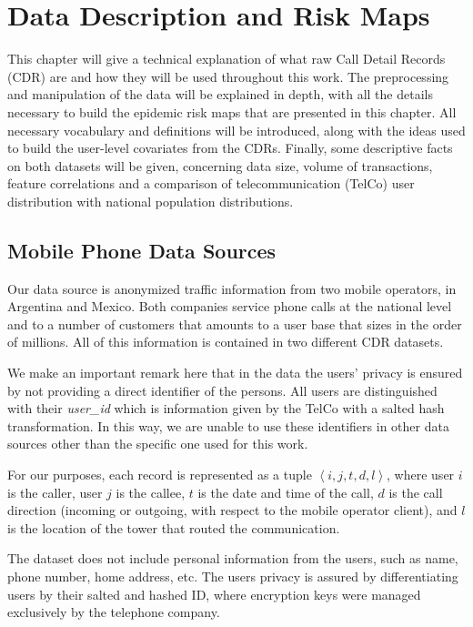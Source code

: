 
\chapter{Data Description and Risk Maps}\label{ch:descr-risk}

This chapter will give a technical explanation of what raw Call Detail Records (CDR) are and how they will be used throughout this work.
The preprocessing and manipulation of the data will be explained in depth, with all the details necessary to build the epidemic risk maps that are presented in this chapter.
All necessary vocabulary and definitions will be introduced, along with the ideas used to build the user-level covariates from the CDRs.
Finally, some descriptive facts on both datasets will be given, concerning data size, volume of transactions, feature correlations and a comparison of telecommunication (TelCo) user distribution with national population distributions.


\section{Mobile Phone Data Sources}

Our data source is anonymized traffic information from two mobile operators, in Argentina and Mexico.
Both companies service phone calls at the national level and to a number of customers that amounts to a user base that sizes in the order of millions.
All of this information is contained in two different CDR datasets.

We make an important remark here that in the data the users' privacy is ensured by not providing a direct identifier of the persons.
All users are distinguished with their \textit{user\_id} which is information given by the TelCo with a salted hash transformation.
In this way, we are unable to use these identifiers in other data sources other than the specific one used for this work.

For our purposes, each record is represented as a tuple $\left < i, j, t, d, l \right >$, where user $i$ is the caller, user $j$ is the callee, $t$ is the date and time of the call, $d$ is the call direction (incoming or outgoing, with respect to the mobile operator client), and $l$ is the location of the tower that routed the communication.

The dataset does not include personal information from the users, such as name, phone number, home address, etc.
The users privacy is assured by differentiating users by their salted and hashed ID, where encryption keys were managed exclusively by the telephone company.

